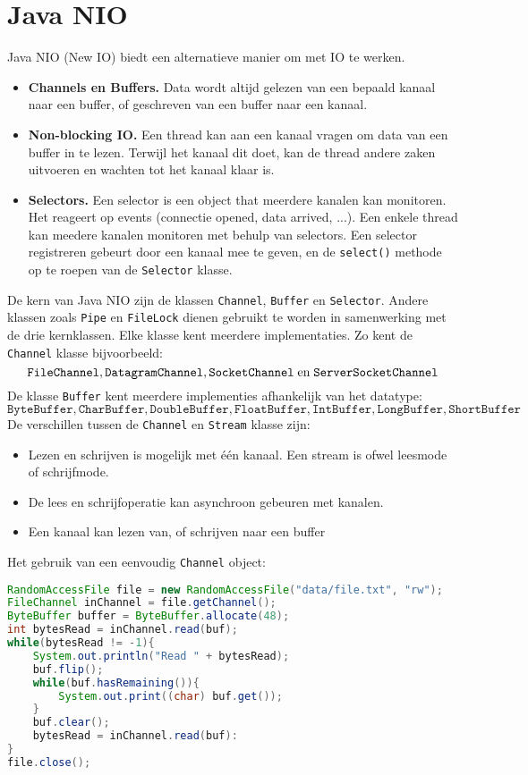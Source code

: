 \documentclass{report}
\begin{document}
\chapter{Java NIO}
Java NIO (New IO) biedt een alternatieve manier om met IO te werken.
\begin{itemize}
    \item \textbf{Channels en Buffers.} Data wordt altijd gelezen van een bepaald kanaal naar een buffer, of geschreven van een buffer naar een kanaal.
    \item \textbf{Non-blocking IO.} Een thread kan aan een kanaal vragen om data van een buffer in te lezen. Terwijl het kanaal dit doet, kan de thread andere zaken uitvoeren en wachten tot het kanaal klaar is.
    \item \textbf{Selectors.} Een selector is een object that meerdere kanalen kan monitoren. Het reageert op events (connectie opened, data arrived, ...). Een enkele thread kan meedere kanalen monitoren met behulp van selectors. Een selector registreren gebeurt door een kanaal mee te geven, en de \texttt{select()} methode op te roepen van de \texttt{Selector} klasse.
\end{itemize}
De kern van Java NIO zijn de klassen \texttt{Channel}, \texttt{Buffer} en \texttt{Selector}. Andere klassen zoals \texttt{Pipe} en \texttt{FileLock} dienen gebruikt te worden in samenwerking met de drie kernklassen. Elke klasse kent meerdere implementaties. Zo kent de \texttt{Channel} klasse bijvoorbeeld: 
$$\texttt{FileChannel}, \texttt{DatagramChannel}, \texttt{SocketChannel}\;\hbox{en}\;\texttt{ServerSocketChannel}$$ 
De klasse \texttt{Buffer} kent meerdere implementies afhankelijk van het datatype: 
$$\texttt{ByteBuffer}, \texttt{CharBuffer}, \texttt{DoubleBuffer}, \texttt{FloatBuffer}, \texttt{IntBuffer}, \texttt{LongBuffer}, \texttt{ShortBuffer}$$ 
De verschillen tussen de \texttt{Channel} en \texttt{Stream} klasse zijn:
\begin{itemize}
    \item Lezen en schrijven is mogelijk met één kanaal. Een stream is ofwel leesmode of schrijfmode.
    \item De lees en schrijfoperatie kan asynchroon gebeuren met kanalen.
    \item Een kanaal kan lezen van, of schrijven naar een buffer
\end{itemize}
Het gebruik van een eenvoudig \texttt{Channel} object:
\begin{lstlisting}[language=java]
RandomAccessFile file = new RandomAccessFile("data/file.txt", "rw");
FileChannel inChannel = file.getChannel();
ByteBuffer buffer = ByteBuffer.allocate(48);
int bytesRead = inChannel.read(buf);
while(bytesRead != -1){
    System.out.println("Read " + bytesRead);
    buf.flip();
    while(buf.hasRemaining()){
        System.out.print((char) buf.get());
    }
    buf.clear();
    bytesRead = inChannel.read(buf):
}
file.close();
\end{lstlisting}
\end{document}
